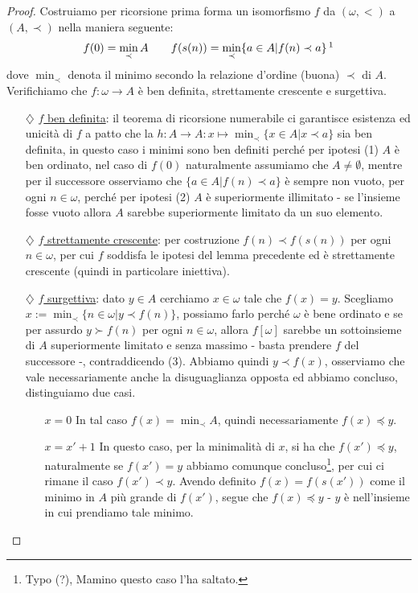 \begin{proof}
	Costruiamo per ricorsione prima forma un isomorfismo $f$ da $(\omega, <)$ a $(A,\prec)$ nella maniera seguente:
	\[ f(0) = \min_\prec A \qquad f(s(n)) = \min_\prec\{a \in A | f(n) \prec a\} \,\footnote{Cioè la funzione prende ogni volta l'elemento più piccolo non ancora nell'immagine, come vedremo questo è l'unico isomorfismo sensato - e possibile - tra buoni ordinamenti.}
		\]
	dove $\min_\prec$ denota il minimo secondo la relazione d'ordine (buona) $\prec$ di $A$. Verifichiamo che $f : \omega \to A$ è ben definita, strettamente crescente e surgettiva.
	\begin{itemize}
		\item[$\diamondsuit$] \underline{$f$ ben definita}: il teorema di ricorsione numerabile ci garantisce esistenza ed unicità di $f$ a patto che la $h : A \to A : x \mapsto \min_\prec\{x \in A | x \prec a\}$ sia ben definita, in questo caso i minimi sono ben definiti perché per ipotesi (1) $A$ è ben ordinato, nel caso di $f(0)$ naturalmente assumiamo che $A \ne \emptyset$,
		mentre per il successore osserviamo che $\{a \in A | f(n) \prec a\}$ è sempre non vuoto, per ogni $n \in \omega$, perché per ipotesi (2) $A$ è superiormente illimitato - se l'insieme fosse vuoto allora $A$ sarebbe superiormente limitato da un suo elemento.
		\item[$\diamondsuit$] \underline{$f$ strettamente crescente}: per costruzione $f(n) \prec f(s(n))$ per ogni $n \in \omega$, per cui $f$ soddisfa le ipotesi del lemma precedente ed è strettamente crescente (quindi in particolare iniettiva).
		\item[$\diamondsuit$] \underline{$f$ surgettiva}: dato $y \in A$ cerchiamo $x \in \omega$ tale che $f(x) = y$. Scegliamo $x := \min_{\prec}\{n \in \omega | y \prec f(n)\}$, possiamo farlo perché $\omega$ è bene ordinato e se per assurdo $y \succ f(n)$ per ogni $n \in \omega$,
		allora $f[\omega]$ sarebbe un sottoinsieme di $A$ superiormente limitato e senza massimo - basta prendere $f$ del successore -, contraddicendo (3). Abbiamo quindi $y \prec f(x)$, osserviamo che vale necessariamente anche la disuguaglianza opposta ed abbiamo concluso, distinguiamo due casi.
		\begin{itemize}
			\item[$\boxed{x = 0}$] In tal caso $f(x) = \min_\prec A$, quindi necessariamente $f(x) \preceq y$.
			\item[$\boxed{x = x' + 1}$] In questo caso, per la minimalità di $x$, si ha che $f(x') \preceq y$, naturalmente se $f(x') = y$ abbiamo comunque concluso\footnote{Typo (?), Mamino questo caso l'ha saltato.}, per cui ci rimane il caso $f(x') \prec y$.
			Avendo definito $f(x) = f(s(x'))$ come il minimo in $A$ più grande di $f(x')$, segue che $f(x) \preceq y$ - $y$ è nell'insieme in cui prendiamo tale minimo.
		\end{itemize}
	\end{itemize}
\end{proof}

